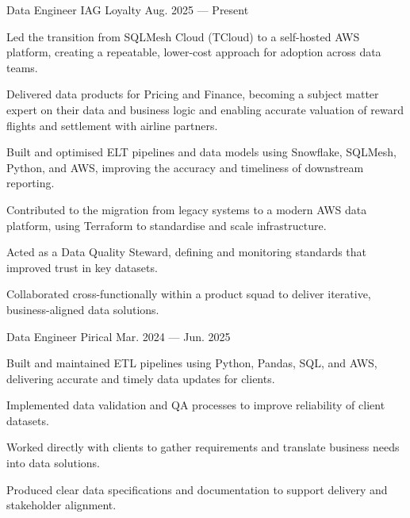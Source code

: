 
\begin{cventries}

  \cventry
  {Data Engineer}
  {IAG Loyalty}
  {}
  {Aug. 2025 --- Present}
  {
    \begin{cvitems}
      \item {Led the transition from SQLMesh Cloud (TCloud) to a self-hosted AWS platform, creating a repeatable, lower-cost approach for adoption across data teams.}
      \item {Delivered data products for Pricing and Finance, becoming a subject matter expert on their data and business logic and enabling accurate valuation of reward flights and settlement with airline partners.}
      \item {Built and optimised ELT pipelines and data models using Snowflake, SQLMesh, Python, and AWS, improving the accuracy and timeliness of downstream reporting.}
      \item {Contributed to the migration from legacy systems to a modern AWS data platform, using Terraform to standardise and scale infrastructure.}
      \item {Acted as a Data Quality Steward, defining and monitoring standards that improved trust in key datasets.}
      \item {Collaborated cross-functionally within a product squad to deliver iterative, business-aligned data solutions.}
    \end{cvitems}
  }

  \cventry
  {Data Engineer}
  {Pirical}
  {}
  {Mar. 2024 --- Jun. 2025}
  {
    \begin{cvitems}
      \item {Built and maintained ETL pipelines using Python, Pandas, SQL, and AWS, delivering accurate and timely data updates for clients.}
      \item {Implemented data validation and QA processes to improve reliability of client datasets.}
      \item {Worked directly with clients to gather requirements and translate business needs into data solutions.}
      \item {Produced clear data specifications and documentation to support delivery and stakeholder alignment.}
    \end{cvitems}
  }


\end{cventries}
